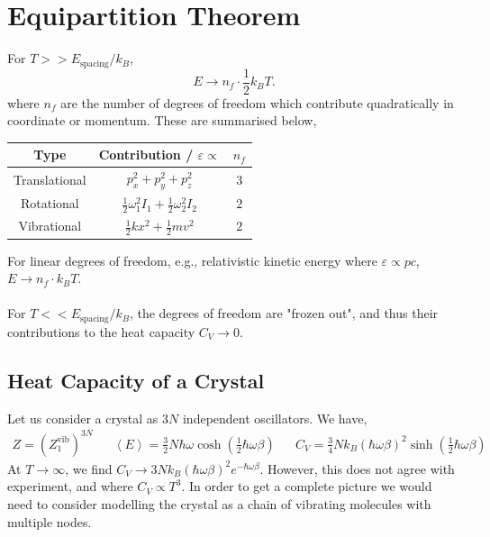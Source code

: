 \documentclass{book}
\begin{document}
\section{Equipartition Theorem}
For $T >> E_{\text{spacing}}/k_B$,
\begin{equation}
	E \to n_f \cdot \frac{1}{2}k_BT.
\end{equation}
where $n_f$ are the number of degrees of freedom which contribute quadratically in coordinate or momentum. These are summarised below,
\begin{center}
\begin{tabular}{|c|c|c|}
	\hline 
	Type & Contribution / $\varepsilon \propto$ & $n_f$ \\
	\hline
	Translational & $p_x^2 + p_y^2 + p_z^2$ & $3$ \\
	Rotational & $\frac{1}{2}\omega_1^2I_1 + \frac{1}{2}\omega_2^2I_2$ & $2$ \\
	Vibrational & $\frac{1}{2}kx^2 + \frac{1}{2}mv^2$ & $2$ \\
	\hline
\end{tabular}
\end{center}
For linear degrees of freedom, e.g., relativistic kinetic energy where $\varepsilon \propto pc$, $E \to n_f \cdot k_BT$.\\\\
For $T << E_{\text{spacing}}/k_B$, the degrees of freedom are "frozen out", and thus their contributions to the heat capacity $C_V \to 0$.
\subsection{Heat Capacity of a Crystal}
Let us consider a crystal as $3N$ independent oscillators. We have,
\begin{align}
	Z = \left(Z_1^{\text{vib}}\right)^{3N} && \left<E\right> = \frac{3}{2}N\hbar\omega\cosh\left(\frac{1}{2}\hbar\omega\beta\right) && C_V = \frac{3}{4}Nk_B\left(\hbar\omega\beta\right)^2\sinh\left(\frac{1}{2}\hbar\omega\beta\right)
\end{align}
At $T \to \infty$, we find $C_V \to 3Nk_B\left(\hbar\omega\beta\right)^2e^{-\hbar\omega\beta}$. However, this does not agree with experiment, and where $C_V \propto T^3$. In order to get a complete picture we would need to consider modelling the crystal as a chain of vibrating molecules with multiple nodes.
\end{document}
